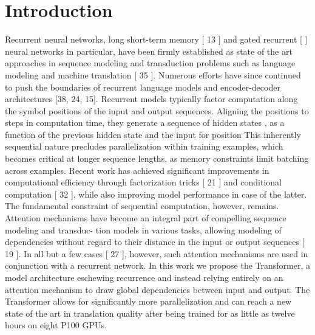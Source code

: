 \documentclass[12pt, a4paper]{article}
\begin{document}
\section{Introduction}
Recurrent neural networks, long short-term memory [ 13 ] and gated recurrent [ ] neural networks in particular, have been firmly established as state of the art approaches in sequence modeling and transduction problems such as language modeling and machine translation [ 35 ]. Numerous efforts have since continued to push the boundaries of recurrent language models and encoder-decoder architectures [38, 24, 15]. Recurrent models typically factor computation along the symbol positions of the input and output sequences. Aligning the positions to steps in computation time, they generate a sequence of hidden states , as a function of the previous hidden state and the input for position This inherently sequential nature precludes parallelization within training examples, which becomes critical at longer sequence lengths, as memory constraints limit batching across examples. Recent work has achieved significant improvements in computational efficiency through factorization tricks [ 21 ] and conditional computation [ 32 ], while also improving model performance in case of the latter. The fundamental constraint of sequential computation, however, remains. Attention mechanisms have become an integral part of compelling sequence modeling and transduc- tion models in various tasks, allowing modeling of dependencies without regard to their distance in the input or output sequences [ 19 ]. In all but a few cases [ 27 ], however, such attention mechanisms are used in conjunction with a recurrent network. In this work we propose the Transformer, a model architecture eschewing recurrence and instead relying entirely on an attention mechanism to draw global dependencies between input and output. The Transformer allows for significantly more parallelization and can reach a new state of the art in translation quality after being trained for as little as twelve hours on eight P100 GPUs.
\end{document}

